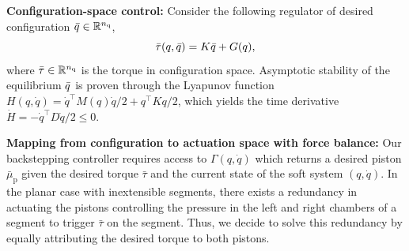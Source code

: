 \textbf{Configuration-space control:}
%
Consider the following regulator of desired configuration $\Bar{q} \in \mathbb{R}^{n_\mathrm{q}}$, 
%
\begin{equation}\label{eq:backstepping:high_level_regulation}
    \Bar{\tau}(q, \Bar{q}) = K \Bar{q} + G(q),
\end{equation}
%
where $\Bar{\tau} \in \mathbb{R}^{n_\mathrm{q}}$ is the torque in configuration space. %
%
Asymptotic stability of the equilibrium $\Bar{q}$ is proven through the Lyapunov function $H(q, \dot{q}) = \dot{q}^{\top} M(q) \dot{q}/2 + q^\top K q/2$, which yields the time derivative $\dot{H} = -\dot{q}^\top D \dot{q}/2 \leq 0$.

\textbf{Mapping from configuration to actuation space with force balance:}
Our backstepping controller requires access to $\Gamma(q,\dot{q})$ which returns a desired piston $\bar{\mu}_\mathrm{p}$ given the desired torque $\bar{\tau}$ and the current state of the soft system $(q,\dot{q})$. In the planar case with inextensible segments, there exists a redundancy in actuating the pistons controlling the pressure in the left and right chambers of a segment to trigger $\bar{\tau}$ on the segment. Thus, we decide to solve this redundancy by equally attributing the desired torque to both pistons.

